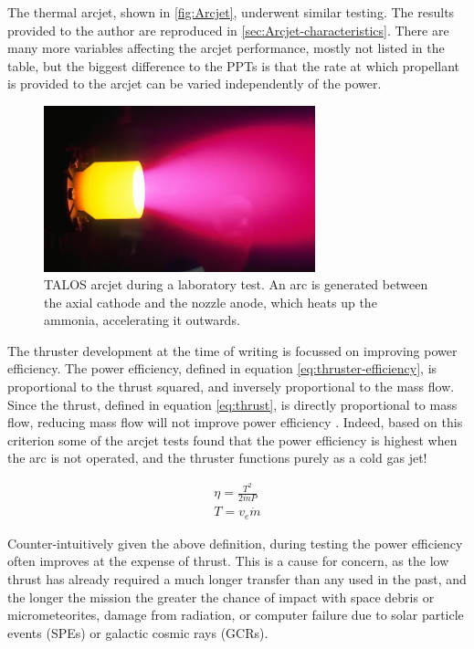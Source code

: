 The thermal arcjet, shown in \autoref{fig:Arcjet}, underwent similar testing. The results provided to the author are reproduced in \autoref{sec:Arcjet-characteristics}. There are many more variables affecting the arcjet performance, mostly not listed in the table, but the biggest difference to the PPTs is that the rate at which propellant is provided to the arcjet can be varied independently of the power. 

\begin{figure}
\centering
\includegraphics[width=0.7\textwidth]{Images/hiparc_betrieb.png}
\caption{TALOS arcjet during a laboratory test. An arc is generated between the axial cathode and the nozzle anode, which heats up the ammonia, accelerating it outwards.} \label{fig:Arcjet}
\end{figure}

The thruster development at the time of writing  is focussed on improving power efficiency. The power efficiency, defined in equation \eqref{eq:thruster-efficiency}, is proportional to the thrust squared, and inversely proportional to the mass flow. Since the thrust, defined in equation \eqref{eq:thrust}, is directly proportional to mass flow, reducing mass flow will not improve power efficiency \parencite{Wollenhaupt2011}. Indeed, based on this criterion some of the arcjet tests found that the power efficiency is highest when the arc is not operated, and the thruster functions purely as a cold gas jet! 

\begin{subequations}
\begin{gather}
\eta = \frac{T^2}{2\dot{m}P} \label{eq:thruster-efficiency}\\
T = v_e\dot{m} \label{eq:thrust} 
\end{gather}
\end{subequations}

Counter-intuitively given the above definition, during testing the power efficiency often improves at the expense of thrust. This is a cause for concern, as the low thrust has already required a much longer transfer than any used in the past, and the longer the mission the greater the chance of impact with space debris or micrometeorites, damage from radiation, or computer failure due to solar particle events (SPEs) or galactic cosmic rays (GCRs).

